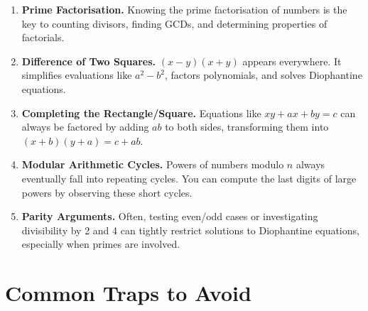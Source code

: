 \documentclass[11pt,a4paper]{article}
\begin{document}
\begin{enumerate}[leftmargin=2em, itemsep=4pt]
  \item \textbf{Prime Factorisation.}
        Knowing the prime factorisation of numbers is the key to counting divisors, finding GCDs, and determining properties of factorials. 
  \item \textbf{Difference of Two Squares.}
        $(x-y)(x+y)$ appears everywhere. It simplifies evaluations like $a^2 - b^2$, factors polynomials, and solves Diophantine equations. 
  \item \textbf{Completing the Rectangle/Square.}
        Equations like $xy + ax + by = c$ can always be factored by adding $ab$ to both sides, transforming them into $(x+b)(y+a) = c+ab$. 
  \item \textbf{Modular Arithmetic Cycles.}
        Powers of numbers modulo $n$ always eventually fall into repeating cycles. You can compute the last digits of large powers by observing these short cycles. 
  \item \textbf{Parity Arguments.}
        Often, testing even/odd cases or investigating divisibility by 2 and 4 can tightly restrict solutions to Diophantine equations, especially when primes are involved. 
\end{enumerate}

\section*{Common Traps to Avoid}
\end{document}

